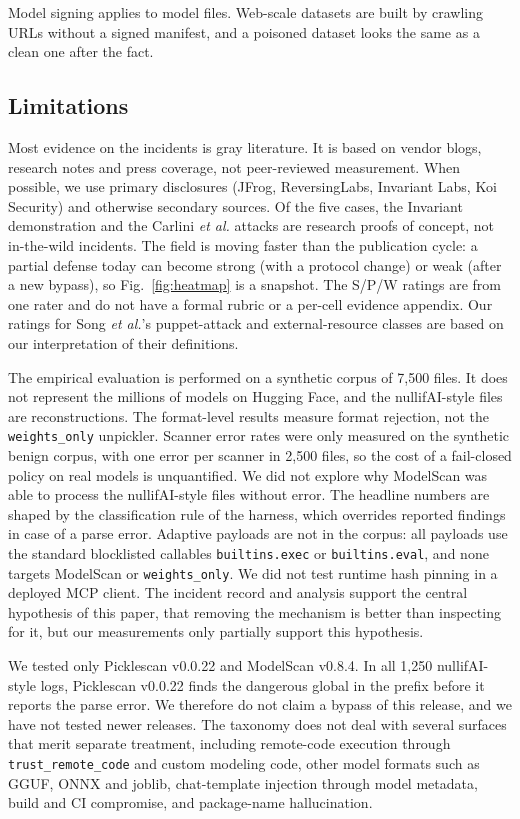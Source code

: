 \documentclass[conference]{IEEEtran}
\begin{document}
Model signing applies to model files. Web-scale datasets are built by crawling URLs without a signed manifest, and a poisoned dataset looks the same as a clean one after the fact.

\subsection{Limitations}

Most evidence on the incidents is gray literature. It is based on vendor blogs, research notes and press coverage, not peer-reviewed measurement. When possible, we use primary disclosures (JFrog, ReversingLabs, Invariant Labs, Koi Security) and otherwise secondary sources. Of the five cases, the Invariant demonstration and the Carlini \textit{et al.} attacks are research proofs of concept, not in-the-wild incidents. The field is moving faster than the publication cycle: a partial defense today can become strong (with a protocol change) or weak (after a new bypass), so Fig.~\ref{fig:heatmap} is a snapshot. The S/P/W ratings are from one rater and do not have a formal rubric or a per-cell evidence appendix. Our ratings for Song \textit{et al.}'s puppet-attack and external-resource classes are based on our interpretation of their definitions.

The empirical evaluation is performed on a synthetic corpus of 7,500 files. It does not represent the millions of models on Hugging Face, and the nullifAI-style files are reconstructions. The format-level results measure format rejection, not the \texttt{weights\_only} unpickler. Scanner error rates were only measured on the synthetic benign corpus, with one error per scanner in 2,500 files, so the cost of a fail-closed policy on real models is unquantified. We did not explore why ModelScan was able to process the nullifAI-style files without error. The headline numbers are shaped by the classification rule of the harness, which overrides reported findings in case of a parse error. Adaptive payloads are not in the corpus: all payloads use the standard blocklisted callables \texttt{builtins.exec} or \texttt{builtins.eval}, and none targets ModelScan or \texttt{weights\_only}. We did not test runtime hash pinning in a deployed MCP client. The incident record and analysis support the central hypothesis of this paper, that removing the mechanism is better than inspecting for it, but our measurements only partially support this hypothesis.

We tested only Picklescan v0.0.22 and ModelScan v0.8.4. In all 1,250 nullifAI-style logs, Picklescan v0.0.22 finds the dangerous global in the prefix before it reports the parse error. We therefore do not claim a bypass of this release, and we have not tested newer releases. The taxonomy does not deal with several surfaces that merit separate treatment, including remote-code execution through \texttt{trust\_remote\_code} and custom modeling code, other model formats such as GGUF, ONNX and joblib, chat-template injection through model metadata, build and CI compromise, and package-name hallucination.
\end{document}
